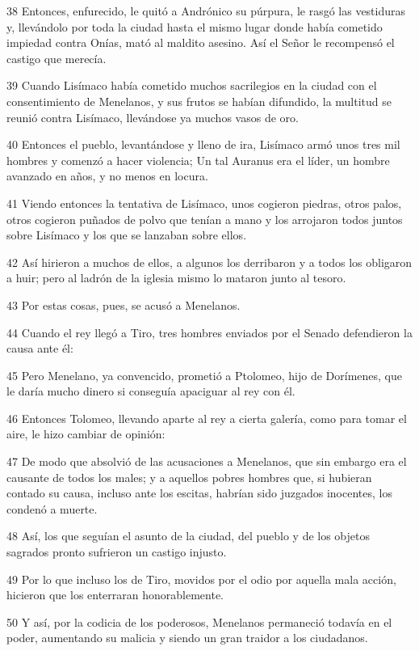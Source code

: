 \par 38 Entonces, enfurecido, le quitó a Andrónico su púrpura, le rasgó las vestiduras y, llevándolo por toda la ciudad hasta el mismo lugar donde había cometido impiedad contra Onías, mató al maldito asesino. Así el Señor le recompensó el castigo que merecía.
\par 39 Cuando Lisímaco había cometido muchos sacrilegios en la ciudad con el consentimiento de Menelanos, y sus frutos se habían difundido, la multitud se reunió contra Lisímaco, llevándose ya muchos vasos de oro.
\par 40 Entonces el pueblo, levantándose y lleno de ira, Lisímaco armó unos tres mil hombres y comenzó a hacer violencia; Un tal Auranus era el líder, un hombre avanzado en años, y no menos en locura.
\par 41 Viendo entonces la tentativa de Lisímaco, unos cogieron piedras, otros palos, otros cogieron puñados de polvo que tenían a mano y los arrojaron todos juntos sobre Lisímaco y los que se lanzaban sobre ellos.
\par 42 Así hirieron a muchos de ellos, a algunos los derribaron y a todos los obligaron a huir; pero al ladrón de la iglesia mismo lo mataron junto al tesoro.
\par 43 Por estas cosas, pues, se acusó a Menelanos.
\par 44 Cuando el rey llegó a Tiro, tres hombres enviados por el Senado defendieron la causa ante él:
\par 45 Pero Menelano, ya convencido, prometió a Ptolomeo, hijo de Dorímenes, que le daría mucho dinero si conseguía apaciguar al rey con él.
\par 46 Entonces Tolomeo, llevando aparte al rey a cierta galería, como para tomar el aire, le hizo cambiar de opinión:
\par 47 De modo que absolvió de las acusaciones a Menelanos, que sin embargo era el causante de todos los males; y a aquellos pobres hombres que, si hubieran contado su causa, incluso ante los escitas, habrían sido juzgados inocentes, los condenó a muerte.
\par 48 Así, los que seguían el asunto de la ciudad, del pueblo y de los objetos sagrados pronto sufrieron un castigo injusto.
\par 49 Por lo que incluso los de Tiro, movidos por el odio por aquella mala acción, hicieron que los enterraran honorablemente.
\par 50 Y así, por la codicia de los poderosos, Menelanos permaneció todavía en el poder, aumentando su malicia y siendo un gran traidor a los ciudadanos.

